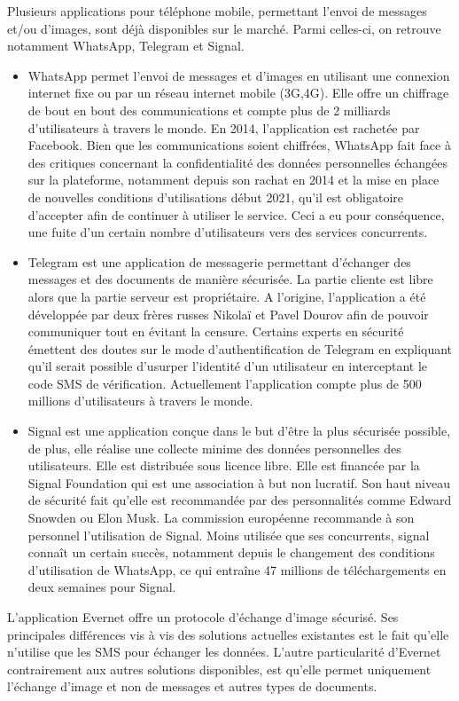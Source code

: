 \documentclass[a4paper, 12pt]{article}
\begin{document}
Plusieurs applications pour téléphone mobile, permettant l'envoi de messages et/ou d'images, sont déjà disponibles sur le marché. Parmi celles-ci, on retrouve notamment WhatsApp, Telegram et Signal.
\begin{itemize}
    \item WhatsApp permet l'envoi de messages et d'images en utilisant une connexion internet fixe ou par un réseau internet mobile (3G,4G). Elle offre un chiffrage de bout en bout des communications et compte plus de 2 milliards d'utilisateurs à travers le monde. En 2014, l'application est rachetée par Facebook. Bien que les communications soient chiffrées, WhatsApp fait face à des critiques concernant la confidentialité des données personnelles échangées sur la plateforme, notamment depuis son rachat en 2014 et la mise en place de nouvelles conditions d'utilisations début 2021, qu'il est obligatoire d'accepter afin de continuer à utiliser le service. Ceci a eu pour conséquence, une fuite d'un certain nombre d'utilisateurs vers des services concurrents.
    \item Telegram est une application de messagerie permettant d'échanger des messages et des documents de manière sécurisée. La partie cliente est libre alors que la partie serveur est propriétaire. A l'origine, l'application a été développée par deux frères russes Nikolaï et Pavel Dourov afin de pouvoir communiquer tout en évitant la censure. Certains experts en sécurité émettent des doutes sur le mode d'authentification de Telegram en expliquant qu'il serait possible d'usurper l'identité d'un utilisateur en interceptant le code SMS de vérification. Actuellement l'application compte plus de 500 millions d'utilisateurs à travers le monde.
    \item Signal est une application conçue dans le but d'être la plus sécurisée possible, de plus, elle réalise une collecte minime des données personnelles des utilisateurs. Elle est distribuée sous licence libre. Elle est financée par la Signal Foundation qui est une association à but non lucratif. Son haut niveau de sécurité fait qu'elle est recommandée par des personnalités comme Edward Snowden ou Elon Musk. La commission européenne recommande à son personnel l'utilisation de Signal. Moins utilisée que ses concurrents, signal connaît un certain succès, notamment depuis le changement des conditions d'utilisation de WhatsApp, ce qui entraîne 47 millions de téléchargements en deux semaines pour Signal.
\end{itemize}
L'application Evernet offre un protocole d'échange d'image sécurisé. Ses principales différences vis à vis des solutions actuelles existantes est le fait qu'elle n'utilise que les SMS pour échanger les données. L'autre particularité d'Evernet contrairement aux autres solutions disponibles, est qu'elle permet uniquement l'échange d'image et non de messages et autres types de documents.
\end{document}
